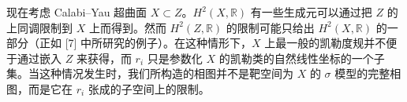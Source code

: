 现在考虑 Calabi--Yau 超曲面 $X\subset Z$。$H^2(X,\mathbb{R})$ 有一些生成元可以通过把 $Z$ 的上同调限制到 $X$ 上而得到。然而 $H^2(Z,\mathbb{R})$ 的限制可能只给出 $H^2(X,\mathbb{R})$ 的一部分（正如 [7] 中所研究的例子）。在这种情形下，$X$ 上最一般的凯勒度规并不便于通过嵌入 $Z$ 来获得，而 $r_i$ 只是参数化 $X$ 的凯勒类的自然线性坐标的一个子集。当这种情况发生时，我们所构造的相图并不是靶空间为 $X$ 的 $\sigma$ 模型的完整相图，而是它在 $r_i$ 张成的子空间上的限制。

